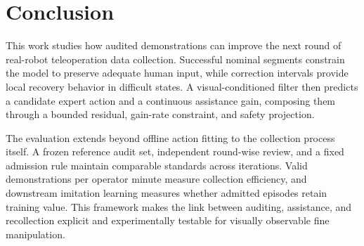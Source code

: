 \section{Conclusion}
\label{sec:conclusion}

This work studies how audited demonstrations can improve the next round of
real-robot teleoperation data collection. Successful nominal segments constrain
the model to preserve adequate human input, while correction intervals provide
local recovery behavior in difficult states. A visual-conditioned filter then
predicts a candidate expert action and a continuous assistance gain, composing
them through a bounded residual, gain-rate constraint, and safety projection.

The evaluation extends beyond offline action fitting to the collection process
itself. A frozen reference audit set, independent round-wise review, and a fixed
admission rule maintain comparable standards across iterations. Valid
demonstrations per operator minute measure collection efficiency, and downstream
imitation learning measures whether admitted episodes retain training value.
This framework makes the link between auditing, assistance, and recollection
explicit and experimentally testable for visually observable fine manipulation.
